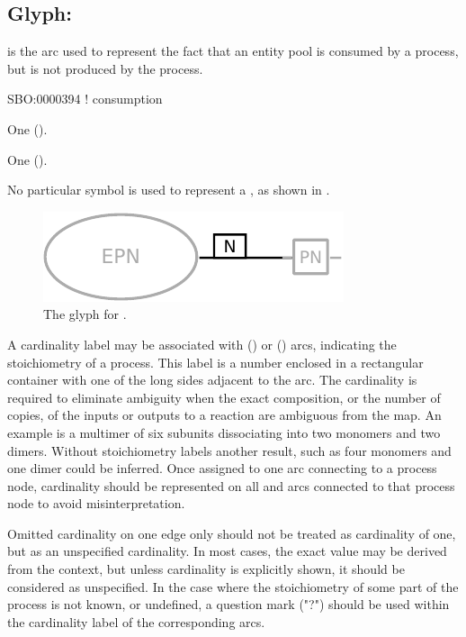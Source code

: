 \subsection{Glyph: }
\label{sec:consumption}

 is the arc used to represent the fact that an entity pool is consumed by a process, but is not produced by the process.

\begin{glyphDescription}

\glyphSboTerm
SBO:0000394 ! consumption

\glyphOrigin
One  ().

\glyphTarget
One  ().

\glyphSymbol
No particular symbol is used to represent a , as shown in .

\end{glyphDescription}

\begin{figure}[H]
  \centering
  \includegraphics{images/consumption}
  \caption{The \PD glyph for .}
  \label{fig:consumption}
\end{figure}

A cardinality label may be associated with  () or  () arcs, indicating the stoichiometry of a process.
This label is a number enclosed in a rectangular container with one of the long sides adjacent to the  arc.
The cardinality is required to eliminate ambiguity when the exact composition, or the number of copies, of the inputs or outputs to a reaction are ambiguous from the map.
An example is a multimer of six subunits dissociating into two monomers and two dimers.
Without stoichiometry labels another result, such as four monomers and one dimer could be inferred.
Once assigned to one arc connecting to a process node, cardinality should be represented on all  and  arcs connected to that process node to avoid misinterpretation.

Omitted cardinality on one edge only should not be treated as cardinality of one, but as an unspecified cardinality.
In most cases, the exact value may be derived from the context, but unless cardinality is explicitly shown, it should be considered as unspecified.
In the case where the stoichiometry of some part of the process is not known, or undefined, a question mark ("?") should be used within the cardinality label of the corresponding arcs.

